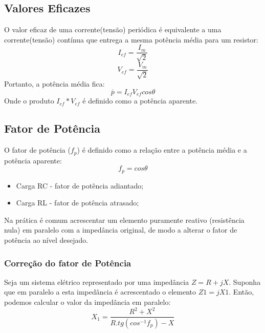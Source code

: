 \documentclass[a4paper, 12pt]{article}
\begin{document}
	\subsection{Valores Eficazes}
		O valor eficaz de uma corrente(tensão) periódica é equivalente a uma corrente(tensão) contínua que entrega a mesma potência média para um resistor:
		\begin{equation}
			I_{ef} = \frac{I_m}{\sqrt{2}}
		\end{equation}
		\begin{equation}
			V_{ef} = \frac{V_m}{\sqrt{2}}
		\end{equation}
		Portanto, a potência média fica:
		\begin{equation}
			\bar{p} = I_{ef} V_{ef} cos \theta
		\end{equation}
		Onde o produto $I_{ef}*V_{ef}$ é definido como a potência aparente.
		
	\subsection{Fator de Potência}
		O fator de potência ($f_p$) é definido como a relação entre a
potência média e a potência aparente:
		\begin{equation}
			f_p = cos\theta
		\end{equation}

		\begin{itemize}
			\item Carga RC - fator de potência adiantado;
			\item Carga RL - fator de potência atrasado;
		\end{itemize}
		Na prática é comum acrescentar um elemento puramente reativo (resistência nula) em paralelo com a impedância original, de modo a alterar o fator de potência ao nível desejado.

	\subsubsection{Correção do fator de Potência}
		Seja um sistema elétrico representado por uma impedância $Z= R + j X$. Suponha que em paralelo a esta
impedância é acrescentado o elemento $Z1= jX1$. Então, podemos calcular o valor da impedância em paralelo:
		\begin{equation}
			X_1 = \frac{R^2 + X^2}{R.tg(cos^{-1} f_p) - X}
		\end{equation}
		
	\newpage
\end{document}
